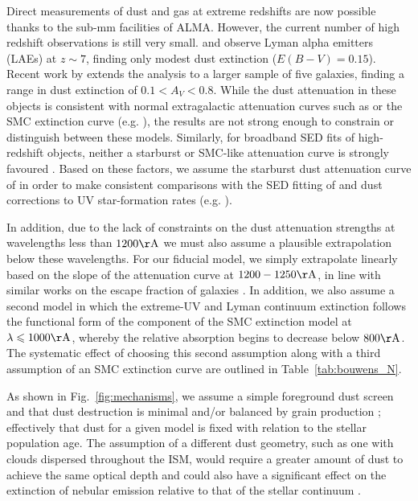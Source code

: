 Direct measurements of dust and gas at extreme redshifts are now possible thanks to the sub-mm facilities of ALMA. However, the current number of high redshift observations is still very small. \citet{2013ApJ...778..102O} and \citet{Ota:2014du} observe Lyman alpha emitters (LAEs) at $z\sim7$, finding only modest dust extinction ($E(B-V) = 0.15$). Recent work by \citet{Schaerer:2014wo} extends the analysis to a larger sample of five galaxies, finding a range in dust extinction of $0.1 < A_{V} < 0.8$. While the dust attenuation in these objects is consistent with normal extragalactic attenuation curves such as \citep{2000ApJ...533..682C} or the SMC extinction curve (e.g. \citet{Pei:1992ey}), the results are not strong enough to constrain or distinguish between these models. Similarly, for broadband SED fits of high-redshift objects, neither a starburst or SMC-like attenuation curve is strongly favoured \citep{Salmon:2014tm}. Based on these factors, we assume the starburst dust attenuation curve of \citet{2000ApJ...533..682C} in order to make consistent comparisons with the SED fitting of \citet{Duncan:2014gh} and \citet{Meurer:1999jm} dust corrections to UV star-formation rates (e.g. \citet{Bouwens:2011tj,Smit:2012is}). 

In addition, due to the lack of constraints on the dust attenuation strengths at wavelengths less than $1200\rm{\AA}$ we must also assume a plausible extrapolation below these wavelengths. For our fiducial model, we simply extrapolate linearly based on the slope of the attenuation curve at $1200-1250 \rm{\AA}$, in line with similar works on the escape fraction of galaxies \citep{Siana:2007bc}. In addition, we also assume a second model in which the extreme-UV and Lyman continuum extinction follows the functional form of the component of the \citet{Pei:1992ey} SMC extinction model at $\lambda \leq 1000 \rm{\AA}$, whereby the relative absorption begins to decrease below $800\rm{\AA}$. The systematic effect of choosing this second assumption along with a third assumption of an SMC extinction curve are outlined in Table~\ref{tab:bouwens_N}.

As shown in Fig.~\ref{fig:mechanisms}, we assume a simple foreground dust screen \citep{1994ApJ...429..582C} and that dust destruction is minimal and/or balanced by grain production \citep{Zafar:2013fe,Rowlands:2014dq}; effectively that dust for a given model is fixed with relation to the stellar population age. The assumption of a different dust geometry, such as one with clouds dispersed throughout the ISM, would require a greater amount of dust to achieve the same optical depth and could also have a significant effect on the extinction of nebular emission relative to that of the stellar continuum \citep{Zackrisson:2013iz}.


